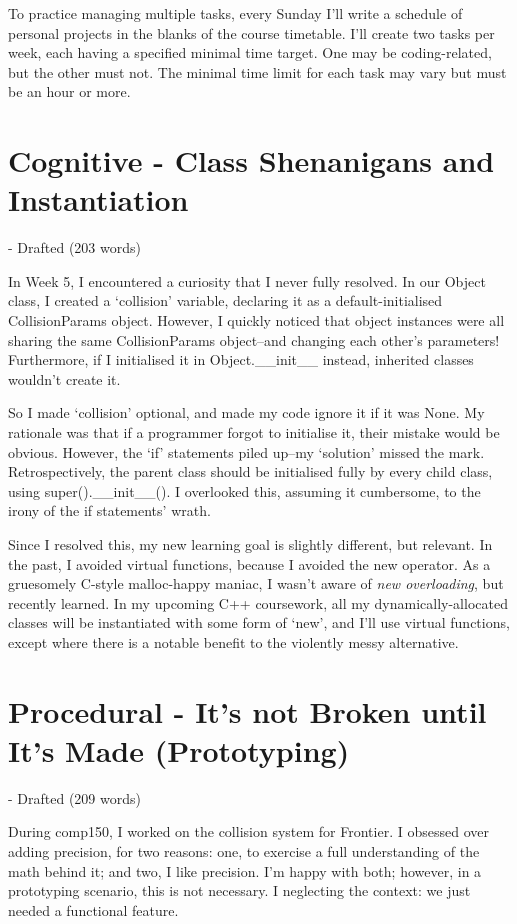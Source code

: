 \documentclass{scrartcl}
\begin{document}
To practice managing multiple tasks, every Sunday I'll write a schedule of personal projects in the blanks of the course timetable. I'll create two tasks per week, each having a specified minimal time target. One may be coding-related, but the other must not. The minimal time limit for each task may vary but must be an hour or more.

\section{Cognitive - Class Shenanigans and Instantiation} - Drafted (203 words)

In Week 5, I encountered a curiosity that I never fully resolved. In our Object class, I created a `collision' variable, declaring it as a default-initialised CollisionParams object. However, I quickly noticed that object instances were all sharing the same CollisionParams object--and changing each other's parameters! Furthermore, if I initialised it in Object.__init__ instead, inherited classes wouldn't create it.

So I made `collision' optional, and made my code ignore it if it was None. My rationale was that if a programmer forgot to initialise it, their mistake would be obvious. However, the `if' statements piled up--my `solution' missed the mark. Retrospectively, the parent class should be initialised fully by every child class, using super().__init__(). I overlooked this, assuming it cumbersome, to the irony of the if statements' wrath.

Since I resolved this, my new learning goal is slightly different, but relevant. In the past, I avoided virtual functions, because I avoided the new operator. As a gruesomely C-style malloc-happy maniac, I wasn't aware of \textit{new overloading}, but recently learned. In my upcoming C++ coursework, all my dynamically-allocated classes will be instantiated with some form of `new', and I'll use virtual functions, except where there is a notable benefit to the violently messy alternative.

\section{Procedural - It's not Broken until It's Made (Prototyping)} - Drafted (209 words)

During comp150, I worked on the collision system for Frontier. I obsessed over adding precision, for two reasons: one, to exercise a full understanding of the math behind it; and two, I like precision. I'm happy with both; however, in a prototyping scenario, this is not necessary. I neglecting the context: we just needed a functional feature.
\end{document}

